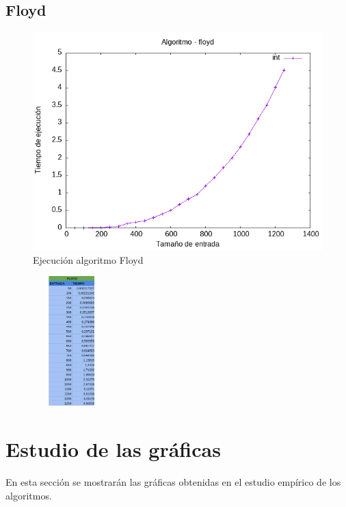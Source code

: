 \documentclass[11pt]{article}
\begin{document}
\subsection{Floyd}
\begin{figure}[H]
    \centering
        \includegraphics[width=0.5\linewidth]{assets/Img/floydint.png}
        \caption{Ejecución algoritmo Floyd}
        \label{fig:floyd}
\end{figure}
\begin{figure}[H]
    \centering
    \includegraphics[width=3cm, height=5cm]{assets/Img/floydtabla.png}
\end{figure}
\section{Estudio de las gráficas}
    En esta sección se mostrarán las gráficas obtenidas en el estudio empírico de los algoritmos. 
\end{document}
